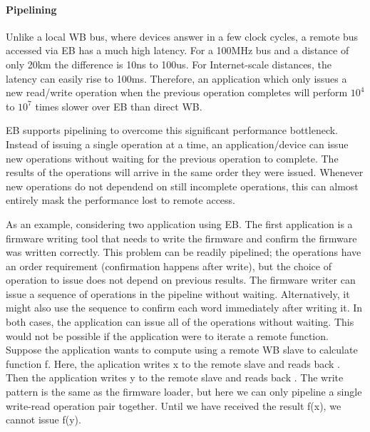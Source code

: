 \paragraph{Pipelining}
Unlike a local WB bus, where devices answer in a few clock cycles, a remote bus accessed via EB has a much high latency. 
For a 100MHz bus and a distance of only 20km the difference is 10ns to 100us. 
For Internet-scale distances, the latency can easily rise to 100ms.
Therefore, an application which only issues a new read/write operation when the previous operation completes will perform $10^4$ to $10^7$ times
slower over EB than direct WB.

\vspace{5 mm}

\noindent  EB supports pipelining to overcome this significant performance bottleneck. 
Instead of issuing a single operation at a time, an application/device can issue new operations without waiting for the previous operation to complete. 
The results of the operations will arrive in the same order they were issued. 
Whenever new operations do not dependend on still incomplete operations, this can almost entirely mask the performance lost to remote access.

\vspace{5 mm}

\noindent As an example, considering two application using EB. 
The first application is a firmware writing tool that needs to write the firmware and confirm the firmware was written correctly. 
This problem can be readily pipelined; the operations have an order requirement (confirmation happens after write), but the choice of operation to issue
does not depend on previous results. 
The firmware writer can issue a sequence of  operations in the pipeline without waiting.
Alternatively, it might also use the sequence  to confirm each word immediately after writing it. 
In both cases, the application can issue all of the operations without waiting. 
This would not be possible if the application were to iterate a remote function. 
Suppose the application wants to compute  using a remote WB slave to calculate function f. 
Here, the aplication writes x to the remote slave and reads back . 
Then the application writes y to the remote slave and reads back .
The write pattern  is the same as the firmware loader, but here we can only pipeline a single write-read operation pair together. 
Until we have received the result f(x), we cannot issue f(y).

